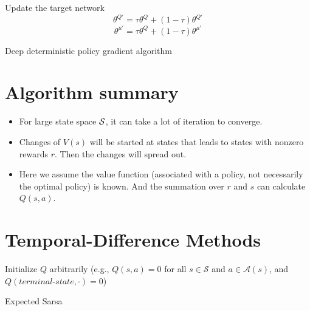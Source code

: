 \begin{refsection}
\begin{algorithm}
{{			Update the target network
			$$\theta^{Q'} = \tau \theta^Q + (1-\tau)\theta^{Q'}$$ 
			$$\theta^{\mu'} = \tau \theta^Q + (1-\tau)\theta^{\mu'}$$
		}
	}
	\caption{Deep deterministic policy gradient algorithm}
\end{algorithm}

\section{Algorithm summary}

\begin{remark}\hfill
\begin{itemize}
	\item For large state space $\mathcal{S}$, it can take a lot of iteration to converge. 
	\item Changes of $V(s)$ will be started at states that leads to states with nonzero rewards $r$. Then the changes will spread out.
\end{itemize}	
	
\end{remark}




\begin{remark}\hfill
	\begin{itemize}
		\item Here we assume the value function (associated with a policy, not necessarily the optimal policy) is known. And the summation over $r$ and $s$ can calculate $Q(s,a)$.
	\end{itemize}	
	
\end{remark}




\section{Temporal-Difference Methods}

\begin{algorithm}
	Initialize $Q$ arbitrarily (e.g., $Q(s,a) = 0$ for all $s\in\mathcal{S}$ and $a\in\mathcal{A}(s)$, and $Q(terminal\text{-}state, \cdot)=0$) \\
	\caption{Expected Sarsa}
\end{algorithm}



\end{refsection}

